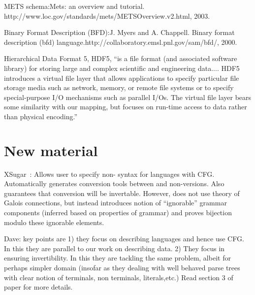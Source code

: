 METS schema:Mets: an overview and
tutorial. http://www.loc.gov/standards/mets/METSOverview.v2.html, 2003.

Binary Format Description (BFD):J. Myers and A. Chappell. Binary
format description (bfd)
language.http://collaboratory.emsl.pnl.gov/sam/bfd/, 2000.

Hierarchical Data Format 5, HDF5, ``is a file format (and associated
software library) for storing large and complex scientific and
engineering data....
HDF5 introduces a virtual file layer that allows applications to
specify particular file storage media such as network, memory, or
remote file systems or to specify special-purpose I/O mechanisms such
as parallel I/Os. The virtual file layer bears some similarity with
our mapping, but focuses on run-time access to data rather than
physical encoding.''

\section{New material}

XSugar~\cite{brabrand+:xsugar2005}: Allows user to specify non-\xml
syntax for \xml languages with CFG. Automatically generates conversion
tools between \xml and non-\xml versions. Also guarantees that
conversion will be invertable. However, does not use theory of Galois
connections, but instead introduces notion of ``ignorable'' grammar
components (inferred based on properties of grammar) and proves
bijection modulo these ignorable elements.

Dave: key points are 1) they focus on describing languages and hence
use CFG. In this they are parallel to our work on describing data. 2)
They focus in ensuring invertibility. In this they are tackling the
same problem, albeit for perhaps simpler domain (insofar as they
dealing with well behaved parse trees with clear notion of terminals,
non terminals, literals,etc.) Read section 3 of paper for more details.
 


%
